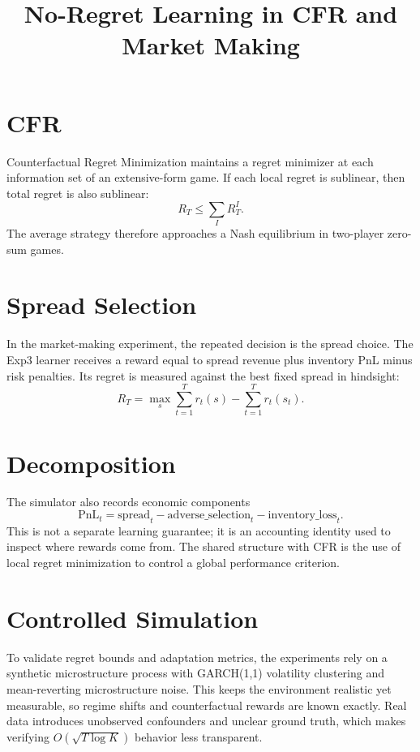 \documentclass[11pt]{article}
\title{No-Regret Learning in CFR and Market Making}
\author{}
\date{}
\begin{document}
\maketitle

\section{CFR}
Counterfactual Regret Minimization maintains a regret minimizer at each
information set of an extensive-form game. If each local regret is sublinear,
then total regret is also sublinear:
\[
R_T \le \sum_{I} R_T^I.
\]
The average strategy therefore approaches a Nash equilibrium in two-player
zero-sum games.

\section{Spread Selection}
In the market-making experiment, the repeated decision is the spread choice.
The Exp3 learner receives a reward equal to spread revenue plus inventory PnL
minus risk penalties. Its regret is measured against the best fixed spread in
hindsight:
\[
R_T = \max_s \sum_{t=1}^T r_t(s)-\sum_{t=1}^T r_t(s_t).
\]

\section{Decomposition}
The simulator also records economic components
\[
\text{PnL}_t
=
\text{spread}_t
- \text{adverse\_selection}_t
- \text{inventory\_loss}_t.
\]
This is not a separate learning guarantee; it is an accounting identity used to
inspect where rewards come from. The shared structure with CFR is the use of
local regret minimization to control a global performance criterion.

\section{Controlled Simulation}
To validate regret bounds and adaptation metrics, the experiments rely on a
synthetic microstructure process with GARCH(1,1) volatility clustering and
mean-reverting microstructure noise. This keeps the environment realistic yet
measurable, so regime shifts and counterfactual rewards are known exactly.
Real data introduces unobserved confounders and unclear ground truth, which
makes verifying $O(\sqrt{T\log K})$ behavior less transparent.
\end{document}
